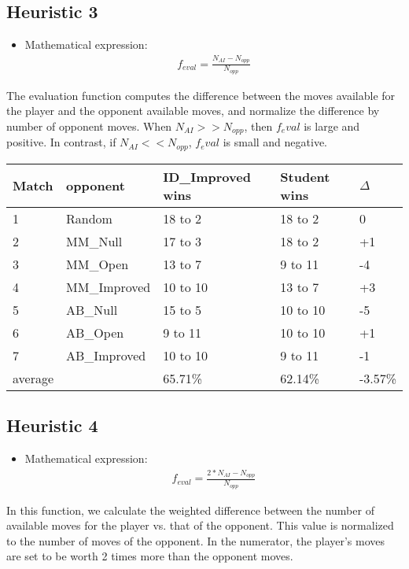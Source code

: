 \documentclass[12pt]{article}
\begin{document}
\subsection{Heuristic 3}
\begin{itemize}
\item Mathematical expression:
\begin{align}
f_{eval} = \frac{N_{AI} - N_{opp}}{N_{opp}}
\end{align}
\end{itemize}
The evaluation function computes the difference between the moves available for the player and the opponent available moves, and normalize the difference by number of opponent moves. When $N_{AI} >> N_{opp}$, then $f_eval$ is large and positive. In contrast, if $N_{AI} << N_{opp}$,  $f_eval$ is small and negative.
\begin{table}[H]
\begin{tabular}{|l|l|l|l|l|}
\hline
Match & opponent & ID\_Improved wins & Student wins & $\Delta$\\
\hline
 1 & Random    &	18 to 2 & 18 to 2 & 0\\
 \hline
  2 & MM\_Null   &	17 to 3 & 18 to 2 & +1\\
  \hline
  3 &  MM\_Open  & 	13 to 7 & 9 to 11 & -4\\
  \hline
  4 &MM\_Improved &	10 to 10 & 13 to 7 & +3\\
  \hline
  5 & AB\_Null   & 15 to 5 & 10 to 10 & -5\\
  \hline 
  6 & AB\_Open  & 	9 to 11 & 10 to 10 & +1\\
  \hline
  7 & AB\_Improved & 10 to 10 & 9 to 11 & -1\\
  \hline
  average & & 65.71\% & 62.14\% & -3.57\%\\
  \hline
\end{tabular}
\end{table}

\subsection{Heuristic 4}
\begin{itemize}
\item Mathematical expression:
\begin{align}
f_{eval} = \frac{2 * N_{AI} - N_{opp}}{N_{opp}}
\end{align}
\end{itemize}
In this function, we calculate the weighted difference between the number of available moves for the player vs. that of the opponent. This value is normalized to the number of moves of the opponent. In the numerator, the player's moves are set to be worth 2 times more than the opponent moves. 
\end{document}
